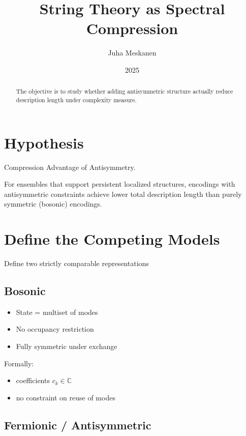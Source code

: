 \documentclass[11pt]{article}
\title{String Theory as Spectral Compression}
\author{Juha Meskanen}
\date{2025}
\begin{document}
\maketitle

\begin{abstract}
The objective is to study whether adding antisymmetric structure actually reduce description length under complexity measure.
\end{abstract}


\tableofcontents
\bigskip

\section{Hypothesis}

Compression Advantage of Antisymmetry.

For ensembles that support persistent localized structures, encodings with antisymmetric constraints achieve lower total description length than purely symmetric (bosonic) encodings.


\section{Define the Competing Models}

Define two strictly comparable representations

\subsection*{Bosonic}

\begin{itemize}
\item State = multiset of modes
\item No occupancy restriction
\item Fully symmetric under exchange
\end{itemize}

Formally:

\begin{itemize}
\item coefficients \( c_k \in \mathbb{C} \)
\item no constraint on reuse of modes
\end{itemize}

\subsection{Fermionic / Antisymmetric}
\end{document}
